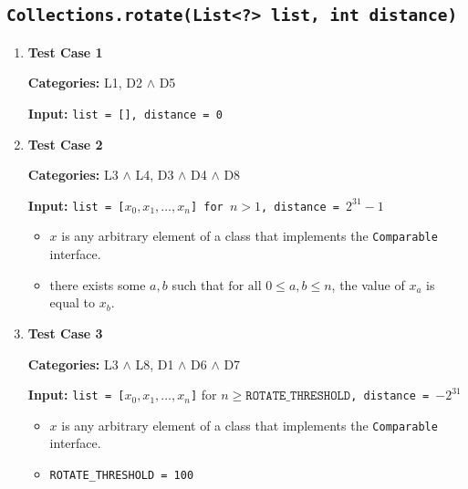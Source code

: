 \documentclass[12pt, a4paper]{article}
\begin{document}
\subsection{\texttt{Collections.rotate(List<?> list, int distance)}}
\begin{enumerate}
  \item \textbf{Test Case 1}
  \par\quad\textbf{Categories:} L1, D2 $\wedge$ D5
  \par\quad\textbf{Input:} \texttt{list = [], distance = 0}

  \item \textbf{Test Case 2}
  \par\quad\textbf{Categories:} L3 $\wedge$ L4, D3 $\wedge$ D4 $\wedge$ D8
  \par\quad\textbf{Input:} \texttt{list = [$x_0, x_1, \dots, x_n$] for $n > 1$, distance = $2^{31} - 1$}
  \begin{itemize}
    \item $x$ is any arbitrary element of a class that implements the \texttt{Comparable}
    interface.
    \item there exists some $a, b$ such that $\text{for all } 0 \leq a,b \leq n$, the value of $x_a$
    is equal to $x_b$.
  \end{itemize}

  \item \textbf{Test Case 3}
  \par\quad\textbf{Categories:} L3 $\wedge$ L8, D1 $\wedge$ D6 $\wedge$ D7
  \par\quad\textbf{Input:} \texttt{list = [$x_0, x_1, \dots, x_n$]} for $n \geq
  \texttt{ROTATE\_THRESHOLD}$\texttt{, distance = $-2^{31}$}
  \begin{itemize}
    \item $x$ is any arbitrary element of a class that implements the \texttt{Comparable} interface.
    \item \texttt{ROTATE\_THRESHOLD = 100} \cite{rotate_threshold_variable}
  \end{itemize}
\end{enumerate}
\end{document}
